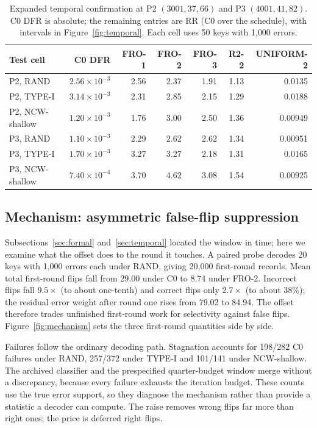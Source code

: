 \documentclass[lettersize,journal,onecolumn]{IEEEtran}
\begin{document}
\begin{table}[!t]
\centering
\small
\caption{Expanded temporal confirmation at P2 $(3001,37,66)$ and P3 $(4001,41,82)$. C0 DFR is absolute; the remaining entries are RR (C0 over the schedule), with intervals in Figure~\ref{fig:temporal}. Each cell uses 50 keys with 1{,}000 errors.}
\label{tab:temporal}
\begin{tabular}{l r rrrrr}
\toprule
Test cell & C0 DFR & FRO-1 & FRO-2 & FRO-3 & R2-2 & UNIFORM-2 \\
\midrule
P2, RAND & $2.56\times10^{-3}$ & 2.56 & 2.37 & 1.91 & 1.13 & 0.0135 \\
P2, TYPE-I & $3.14\times10^{-3}$ & 2.31 & 2.85 & 2.15 & 1.29 & 0.0188 \\
P2, NCW-shallow & $1.20\times10^{-3}$ & 1.76 & 3.00 & 2.50 & 1.36 & 0.00949 \\
P3, RAND & $1.10\times10^{-3}$ & 2.29 & 2.62 & 2.62 & 1.34 & 0.00951 \\
P3, TYPE-I & $1.70\times10^{-3}$ & 3.27 & 3.27 & 2.18 & 1.31 & 0.0165 \\
P3, NCW-shallow & $7.40\times10^{-4}$ & 3.70 & 4.62 & 3.08 & 1.54 & 0.00925 \\
\bottomrule
\end{tabular}
\end{table}
\subsection{Mechanism: asymmetric false-flip suppression}\label{sec:mechanism}

Subsections~\ref{sec:formal} and~\ref{sec:temporal} located the window in time; here we examine what the offset does to the round it touches. A paired probe decodes 20 keys with 1{,}000 errors each under RAND, giving 20{,}000 first-round records. Mean total first-round flips fall from 29.00 under C0 to 8.74 under FRO-2. Incorrect flips fall $9.5\times$ (to about one-tenth) and correct flips only $2.7\times$ (to about 38\%); the residual error weight after round one rises from 79.02 to 84.94. The offset therefore trades unfinished first-round work for selectivity against false flips. Figure~\ref{fig:mechanism} sets the three first-round quantities side by side.

Failures follow the ordinary decoding path. Stagnation accounts for 198/282 C0 failures under RAND, 257/372 under TYPE-I and 101/141 under NCW-shallow. The archived classifier and the prespecified quarter-budget window merge without a discrepancy, because every failure exhausts the iteration budget. These counts use the true error support, so they diagnose the mechanism rather than provide a statistic a decoder can compute. The raise removes wrong flips far more than right ones; the price is deferred right flips.
\end{document}
